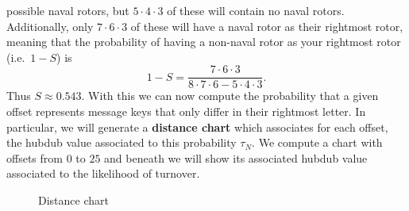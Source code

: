 possible naval rotors, but $5\cdot4\cdot3$ of these will contain no
naval rotors. Additionally, only $7\cdot6\cdot3$ of these will have
a naval rotor as their rightmost rotor, meaning that the
probability of having a non-naval rotor as your rightmost rotor
(i.e.\ $1-S$) is
\[
  1-S = \frac{7\cdot6\cdot3}{8\cdot7\cdot6 - 5\cdot4\cdot3}.
\]
Thus $S\approx0.543$. With this we can now compute the probability
that a given offset represents message keys that only differ in
their rightmost letter. In particular, we will generate a
{\bf{distance chart}} which associates for each offset, the hubdub
value associated to this probability $\tau_N$. We compute a chart
with offsets from $0$ to $25$ and beneath we will show its
associated hubdub value associated to the likelihood of turnover.
\begin{figure}[H]
  \begin{center}
  \end{center}
  \caption{Distance chart}
  \label{fig:distance_chart}
\end{figure}
